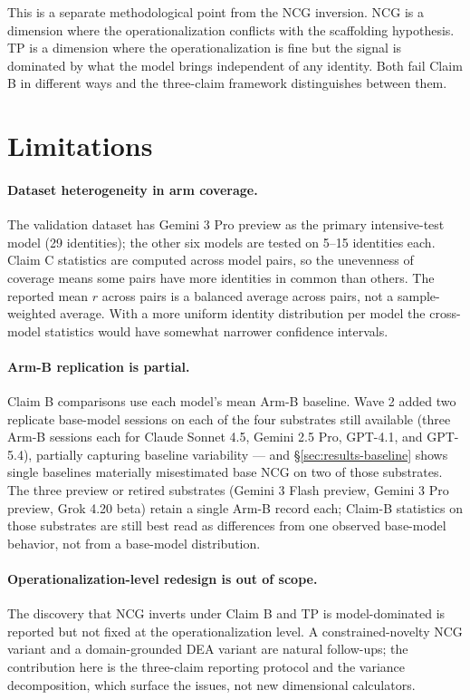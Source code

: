 \documentclass[11pt]{article}
\begin{document}
This is a separate methodological point from the NCG inversion. NCG is a dimension where the operationalization conflicts with the scaffolding hypothesis. TP is a dimension where the operationalization is fine but the signal is dominated by what the model brings independent of any identity. Both fail Claim B in different ways and the three-claim framework distinguishes between them.

\section{Limitations}
\label{sec:limitations}

\paragraph{Dataset heterogeneity in arm coverage.}
The validation dataset has Gemini 3 Pro preview as the primary intensive-test model (29 identities); the other six models are tested on 5--15 identities each. Claim C statistics are computed across model pairs, so the unevenness of coverage means some pairs have more identities in common than others. The reported mean $r$ across pairs is a balanced average across pairs, not a sample-weighted average. With a more uniform identity distribution per model the cross-model statistics would have somewhat narrower confidence intervals.

\paragraph{Arm-B replication is partial.}
Claim B comparisons use each model's mean Arm-B baseline. Wave 2 added two replicate base-model sessions on each of the four substrates still available (three Arm-B sessions each for Claude Sonnet 4.5, Gemini 2.5 Pro, GPT-4.1, and GPT-5.4), partially capturing baseline variability --- and \S\ref{sec:results-baseline} shows single baselines materially misestimated base NCG on two of those substrates. The three preview or retired substrates (Gemini 3 Flash preview, Gemini 3 Pro preview, Grok 4.20 beta) retain a single Arm-B record each; Claim-B statistics on those substrates are still best read as differences from one observed base-model behavior, not from a base-model distribution.

\paragraph{Operationalization-level redesign is out of scope.}
The discovery that NCG inverts under Claim B and TP is model-dominated is reported but not fixed at the operationalization level. A constrained-novelty NCG variant and a domain-grounded DEA variant are natural follow-ups; the contribution here is the three-claim reporting protocol and the variance decomposition, which surface the issues, not new dimensional calculators.
\end{document}
